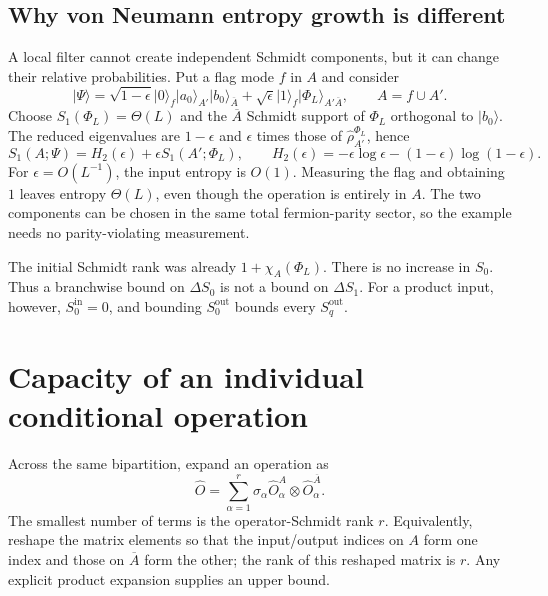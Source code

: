 \documentclass[aps,prb,onecolumn,nofootinbib,superscriptaddress]{revtex4-2}
\newcommand{\ket}[1]{\lvert #1\rangle}
\newcommand{\Abar}{\overline A}
\begin{document}
\subsection{Why von Neumann entropy growth is different}
A local filter cannot create independent Schmidt components, but it can
change their relative probabilities. Put a flag mode $f$ in $A$ and consider
\begin{equation}
 \ket{\Psi}=\sqrt{1-\epsilon}\ket{0}_f
 \ket{a_0}_{A'}\ket{b_0}_{\Abar}
 +\sqrt{\epsilon}\ket{1}_f\ket{\Phi_L}_{A'\Abar},
 \qquad A=f\cup A'.
 \label{eq:filter-example}
\end{equation}
Choose $S_1(\Phi_L)=\Theta(L)$ and the $\Abar$ Schmidt support of
$\Phi_L$ orthogonal to $\ket{b_0}$. The reduced eigenvalues are
$1-\epsilon$ and $\epsilon$ times those of $\hat\rho_{A'}^{\Phi_L}$, hence
\begin{equation}
 S_1(A;\Psi)=H_2(\epsilon)+\epsilon S_1(A';\Phi_L),\qquad
 H_2(\epsilon)=-\epsilon\log\epsilon-(1-\epsilon)\log(1-\epsilon).
 \label{eq:filter-entropy}
\end{equation}
For $\epsilon=O(L^{-1})$, the input entropy is $O(1)$. Measuring the flag
and obtaining $1$ leaves entropy $\Theta(L)$, even though the operation is
entirely in $A$. The two components can be chosen in the same total
fermion-parity sector, so the example needs no parity-violating measurement.

The initial Schmidt rank was already $1+\chi_A(\Phi_L)$. There is no
increase in $S_0$. Thus a branchwise bound on $\Delta S_0$ is not a bound
on $\Delta S_1$. For a product input, however, $S_0^{\mathrm{in}}=0$,
and bounding $S_0^{\mathrm{out}}$ bounds every $S_q^{\mathrm{out}}$.

\section{Capacity of an individual conditional operation}
\label{sec:rank}
Across the same bipartition, expand an operation as
\begin{equation}
 \hat O=\sum_{\alpha=1}^{r}\sigma_\alpha
 \hat O^A_\alpha\otimes\hat O^{\Abar}_\alpha .
 \label{eq:operator-schmidt}
\end{equation}
The smallest number of terms is the operator-Schmidt rank $r$. Equivalently,
reshape the matrix elements so that the input/output indices on $A$ form
one index and those on $\Abar$ form the other; the rank of this reshaped
matrix is $r$. Any explicit product expansion supplies an upper bound.
\end{document}
